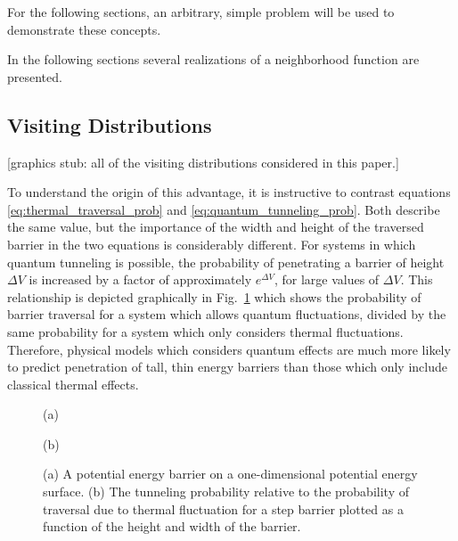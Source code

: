 \documentclass[11pt]{afthesis}
\begin{document}
	For the following sections, an arbitrary, simple problem will be used to demonstrate these concepts.
	
	In the following sections several realizations of a neighborhood function are presented. 
	
	\subsection{Visiting Distributions}
	
	[graphics stub: all of the visiting distributions considered in this paper.]
	
	To understand the origin of this advantage, it is instructive to contrast equations \ref{eq:thermal_traversal_prob} and \ref{eq:quantum_tunneling_prob}. Both describe the same value, but the importance of the width and height of the traversed barrier in the two equations is considerably different. For systems in which quantum tunneling is possible, the probability of penetrating a barrier of height \begin{math} \Delta V \end{math} is increased by a factor of approximately \begin{math} e^{\Delta V} \end{math}, for large values of \begin{math} \Delta V \end{math}. This relationship is depicted graphically in Fig.~\ref{fig:quantum_advantage} which shows the probability of barrier traversal for a system which allows quantum fluctuations, divided by the same probability for a system which only considers thermal fluctuations. Therefore, physical models which considers quantum effects are much more likely to predict penetration of tall, thin energy barriers than those which only include classical thermal effects.
	
	\begin{figure}[ht!]
		
		\begin{minipage}[b]{0.48\linewidth}
			\centering
			\centerline{}
			\centerline{(a)}\medskip
		\end{minipage}
		\hfill
		\begin{minipage}[b]{0.48\linewidth}
			\centering
			\centerline{}
			\centerline{(b)}\medskip
		\end{minipage}
		\caption{
			(a) A potential energy barrier on a one-dimensional potential energy surface.
			(b) The tunneling probability relative to the probability of traversal due to thermal fluctuation for a step barrier plotted as a function of the height and width of the barrier.}
		\label{fig:quantum_advantage}
	\end{figure}
	
\end{document}
